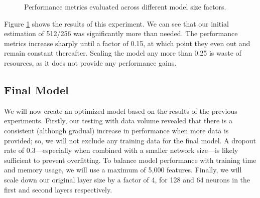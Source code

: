 \documentclass{article}
\begin{document}
\begin{figure}[H]
    \centering
    \caption{Performance metrics evaluated across different model size factors.}
    \label{fig:metrics_vs_factor}
\end{figure}

Figure \ref{fig:metrics_vs_factor} shows the results of this experiment. We can see that
our initial estimation of 512/256 was significantly more than needed. The performance metrics
increase sharply until a factor of 0.15, at which point they even out and remain constant
thereafter. Scaling the model any more than 0.25 is waste of resources, as it does not
provide any performance gains.

\subsection{Final Model}

We will now create an optimized model based on the results of the previous experiments.
Firstly, our testing with data volume revealed that there is a consistent (although gradual)
increase in performance when more data is provided; so, we will not exclude any training
data for the final model. A dropout rate of 0.3---especially when combined with a smaller
network size---is likely sufficient to prevent overfitting. To balance model performance
with training time and memory usage, we will use a maximum of 5,000 features. Finally, we
will scale down our original layer size by a factor of 4, for 128 and 64 neurons in the first
and second layers respectively.
\end{document}
